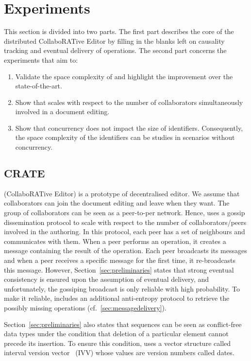 \section{Experiments}
\label{sec:experiments}

This section is divided into two parts. The first part describes the core of
the distributed CollaboRATive Editor \CRATE by filling in the blanks
left on causality tracking and eventual delivery of operations. The second part
concerns the experiments that aim to:

\begin{enumerate}[leftmargin=*]
\item Validate the space complexity of \LSEQ and highlight the improvement
  over the state-of-the-art.
\item Show that \CRATE scales with respect to the number of
  collaborators simultaneously involved in a document editing.
\item Show that concurrency does not impact the size of
  identifiers. Consequently, the space complexity of the identifiers can be
  studies in scenarios without concurrency.
\end{enumerate}

\subsection{CRATE}
\label{subsec:crdt}
\CRATE (CollaboRATive Editor) is a prototype of decentralised editor. We
assume that collaborators can join the document editing and leave when they
want. The group of collaborators can be seen as a peer-to-per network. Hence,
\CRATE uses a gossip dissemination protocol to scale with respect to the
number of collaborators/peers involved in the authoring. In this protocol, each
peer has a set of neighbours and communicates with them. When a peer performs
an operation, it creates a message containing the result of the operation. Each
peer broadcasts its messages and when a peer receives a specific message for
the first time, it re-broadcasts this message. However,
Section~\ref{sec:preliminaries} states that strong eventual consistency is
ensured upon the assumption of eventual delivery, and unfortunately, the
gossiping broadcast is only reliable with high probability. To make it
reliable, \CRATE includes an additional anti-entropy protocol to
retrieve the possibly missing operations (cf.~\ref{sec:messagedelivery}).

Section~\ref{sec:preliminaries} also states that sequences can be seen as
conflict-free data types under the condition that deletion of a particular
element cannot precede its insertion. To ensure this condition, \CRATE
uses a vector structure called interval version
vector~\cite{mukund2014optimized} (IVV) whose values are version numbers called
dates.

